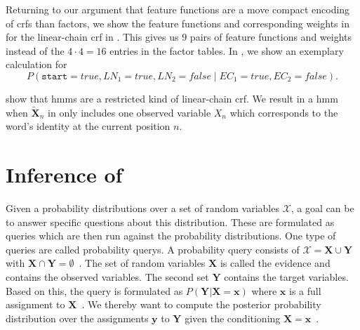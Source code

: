 Returning to our argument that \glspl{feature function} are a move compact encoding of \glspl{crf} than \glspl{factor}, we show the \glspl{feature function} and corresponding weights in  for the \gls{linear-chain crf} in .
This gives us $9$ pairs of \glspl{feature function} and weights instead of the $4\cdot 4=16$ entries in the \gls{factor} tables.
In , we show an exemplary calculation for
\begin{equation*}
P(\texttt{start}{=}\mathit{true},LN_1{=}\mathit{true},LN_2{=}\mathit{false}\mid EC_1{=}\mathit{true},EC_2{=}\mathit{false}).
\end{equation*}
\bigskip

\citet{sutton2010introduction} show that \glspl{hmm} are a restricted kind of \gls{linear-chain crf}.
We result in a \gls{hmm} when $\mathbf{\tilde{X}}_n$ in  only includes one \gls{observed variable} $X_n$ which corresponds to the word's identity at the current position $n$.

\section{Inference of }\label{sec:inference-crfs}

Given a \glspl{probability distribution} over a set of \glspl{random variable} $\mathcal{X}$, a goal can be to answer specific questions about this distribution.
These are formulated as queries which are then run against the \glspl{probability distribution}.
One type of queries are called \glspl{probability query}.
A \gls{probability query} consists of $\mathcal{X}=\mathbf{X}\cup\mathbf{Y}$ with $\mathbf{X}\cap\mathbf{Y}=\emptyset$~\citep{koller2009probabilistic}.
The set of \glspl{random variable} $\mathbf{X}$ is called the \gls{evidence} and contains the \glspl{observed variable}.
The second set $\mathbf{Y}$ contains the \glspl{target variable}.
Based on this, the query is formulated as $P(\mathbf{Y}|\mathbf{X}=\mathbf{x})$ where $\mathbf{x}$ is a \gls{full assignment} to $\mathbf{X}$~\citep{koller2009probabilistic}.
We thereby want to compute the posterior \gls{probability distribution} over the assignments $\mathbf{y}$ to $\mathbf{Y}$ given the conditioning $\mathbf{X}=\mathbf{x}$~\citep{koller2009probabilistic}.

